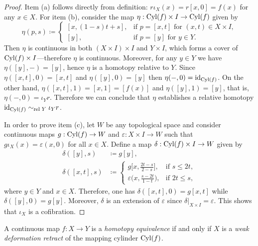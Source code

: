 \begin{proof}
Item (a) follows directly from definition: \(r \iota_X(x) = r[x, 0] = f(x)\) for
any \(x \in X\). For item (b), consider the map \(\eta: \operatorname{Cyl}(f) \times I \to
\operatorname{Cyl}(f)\) given by
\[
\eta(p, s) \coloneq
\begin{cases}
  [x, (1 - s) t + s], &\text{if } p = [x, t]
                        \text{ for } (x, t) \in X \times I, \\
  [y], &\text{if } p = [y] \text{ for } y \in Y.
\end{cases}
\]
Then \(\eta\) is continuous in both \((X \times I) \times I\) and
\(Y \times I\), which forms a cover of \(\operatorname{Cyl}(f) \times I\)---therefore \(\eta\)
is continuous. Moreover, for any \(y \in Y\) we have \(\eta([y], -) = [y]\),
hence \(\eta\) is a homotopy relative to \(Y\). Since
\(\eta([x, t], 0) = [x, t]\) and \(\eta([y], 0) = [y]\) then
\(\eta(-, 0) = \operatorname{id}_{\operatorname{Cyl}(f)}\). On the other hand,
\(\eta([x, t], 1) = [x, 1] = [f(x)]\) and \(\eta([y], 1) = [y]\), that is,
\(\eta(-, 0) = \iota_Y r\). Therefore we can conclude that \(\eta\) establishes a
relative homotopy \(\operatorname{id}_{\operatorname{Cyl}(f)} \sim_{\text{rel }{Y}} \iota_Y r\).

In order to prove item (c), let \(W\) be any topological space and consider
continuous maps \(g: \operatorname{Cyl}(f) \to W\) and \(\varepsilon: X \times I \to W\) such
that \(g \iota_X(x) = \varepsilon(x, 0)\) for all \(x \in X\). Define a map
\(\delta: \operatorname{Cyl}(f) \times I \to W\) given by
\begin{align*}
\delta([y], s)    &\coloneq g[y], \\
\delta([x, t], s) &\coloneq
\begin{cases}
g\big[x, \frac{2 t - s}{2 - s}\big],
&\text{if } s \leq 2 t,
\\
\varepsilon\big(x, \frac{s - 2 t}{1 - t}\big),
&\text{if } 2 t \leq s,
\end{cases}
\end{align*}
where \(y \in Y\) and \(x \in X\). Therefore, one has
\(\delta([x, t], 0) = g[x, t]\) while \(\delta([y], 0) = g[y]\). Moreover,
\(\delta\) is an extension of \(\varepsilon\) since
\(\delta|_{X \times I} = \varepsilon\). This shows that \(\iota_X\) is a
cofibration.
\end{proof}

\begin{lemma}
\label{lem:htpy-equivalence-iff-weak-def-retract}
A continuous map \(f: X \to Y\) is a \emph{homotopy equivalence} if and only if
\(X\) is a \emph{weak deformation retract} of the mapping cylinder \(\operatorname{Cyl}(f)\).
\end{lemma}

